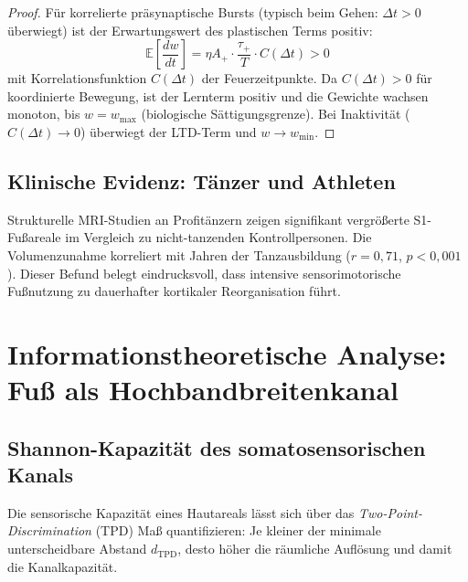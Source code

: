 ﻿\documentclass[12pt,a4paper]{report}
\theoremstyle{plain}
\theoremstyle{definition}
\theoremstyle{remark}
\begin{document}
\begin{proof}
Für korrelierte präsynaptische Bursts (typisch beim Gehen: $\Delta t > 0$
überwiegt) ist der Erwartungswert des plastischen Terms positiv:
\[
  \mathbb{E}\left[\frac{dw}{dt}\right] = \eta A_+ \cdot \frac{\tau_+}{T} \cdot C(\Delta t)
  > 0
\]
mit Korrelationsfunktion $C(\Delta t)$ der Feuerzeitpunkte. Da $C(\Delta t) > 0$
für koordinierte Bewegung, ist der Lernterm positiv und die Gewichte wachsen
monoton, bis $w = w_{\max}$ (biologische Sättigungsgrenze). Bei Inaktivität
($C(\Delta t) \to 0$) überwiegt der LTD-Term und $w \to w_{\min}$.
\end{proof}

\section{Klinische Evidenz: Tänzer und Athleten}

Strukturelle MRI-Studien an Profitänzern \cite{hänggi2010} zeigen signifikant
vergrößerte S1-Fußareale im Vergleich zu nicht-tanzenden Kontrollpersonen.
Die Volumenzunahme korreliert mit Jahren der Tanzausbildung ($r = 0{,}71$,
$p < 0{,}001$). Dieser Befund belegt eindrucksvoll, dass intensive
sensorimotorische Fußnutzung zu dauerhafter kortikaler Reorganisation führt.

\chapter{Informationstheoretische Analyse: Fuß als Hochbandbreitenkanal}

\section{Shannon-Kapazität des somatosensorischen Kanals}

Die sensorische Kapazität eines Hautareals lässt sich über das
\emph{Two-Point-Discrimination} (TPD) Maß quantifizieren: Je kleiner der
minimale unterscheidbare Abstand $d_{\text{TPD}}$, desto höher die räumliche
Auflösung und damit die Kanalkapazität.
\end{document}
